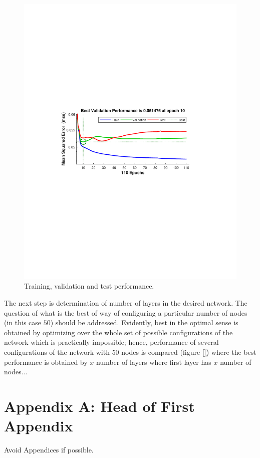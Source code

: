 \documentclass[twocolumn,10pt]{asme2e}
\begin{document}
\begin{figure}[t]
	\centering
	\includegraphics[width=1\linewidth]{./Figures/trainingPerf}
	\caption{ Training, validation and test performance. }
	\label{fig:trainingPerf}
\end{figure}

The next step is determination of number of layers in the desired network. The question of what is the best of way of configuring a particular number of nodes (in this case $50$) should be addressed. Evidently, best in the optimal sense is obtained by optimizing over the whole set of possible configurations of the network which is practically impossible; hence, performance of several configurations of the network with $50$ nodes is compared (figure \ref{}) where the best performance is obtained by $x$ number of layers where first layer has $x$ number of nodes...

 





\appendix       %
\section*{Appendix A: Head of First Appendix}
Avoid Appendices if possible.
\end{document}
